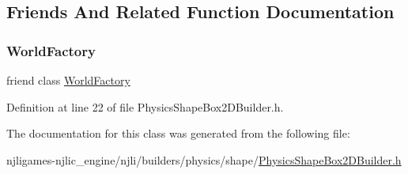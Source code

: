 \subsection{Friends And Related Function Documentation}
\mbox{\label{classnjli_1_1_physics_shape_box2_d_builder_acb96ebb09abe8f2a37a915a842babfac}} 
\subsubsection{\texorpdfstring{World\+Factory}{WorldFactory}}
{\footnotesize\ttfamily friend class \mbox{\hyperlink{classnjli_1_1_world_factory}{World\+Factory}}\hspace{0.3cm}{\ttfamily [friend]}}



Definition at line 22 of file Physics\+Shape\+Box2\+D\+Builder.\+h.



The documentation for this class was generated from the following file\+:\begin{DoxyCompactItemize}
\item 
njligames-\/njlic\+\_\+engine/njli/builders/physics/shape/\mbox{\hyperlink{_physics_shape_box2_d_builder_8h}{Physics\+Shape\+Box2\+D\+Builder.\+h}}\end{DoxyCompactItemize}
